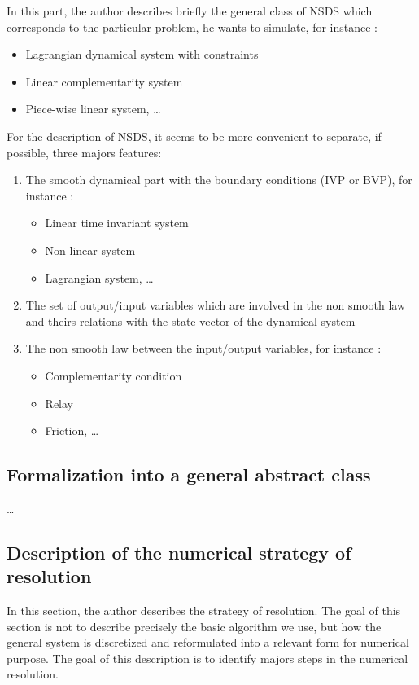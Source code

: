 \documentclass[10pt]{article}
\begin{document}
In this part, the author describes briefly the general class of NSDS which corresponds to the particular problem, he wants to simulate, for instance :
\begin{itemize}
\item Lagrangian dynamical system with constraints
\item Linear complementarity system
\item Piece-wise linear system, \ldots
\end{itemize}

For the description of NSDS, it seems to be more convenient to separate, if possible, three  majors features:
\begin{enumerate}
\item The smooth dynamical part with the boundary conditions (IVP or BVP), for instance :
  \begin{itemize}
  \item Linear time invariant system
  \item Non linear system
  \item Lagrangian system, \ldots
  \end{itemize}
\item The set of output/input variables which are involved in the non smooth law and theirs relations with the state vector of the dynamical system
\item The non smooth law between the input/output variables, for instance :
  \begin{itemize}
  \item Complementarity condition
  \item Relay
  \item Friction, \ldots
  \end{itemize}
\end{enumerate}



\subsection{Formalization into a general abstract class}

 \ldots

\subsection{Description of the numerical strategy of resolution}

In this section, the author describes the strategy of resolution. The goal of this section is not to describe precisely the basic algorithm we use, but how the general system is discretized and reformulated into a relevant form for numerical purpose. The goal of this description is to identify majors steps in the numerical resolution.
\end{document}
